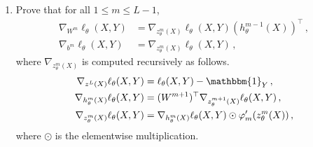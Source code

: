 \documentclass[a4paper,10pt,fleqn]{article}
\newcommand{\eqsp}{\,}
\newcommand{\1}{\ensuremath{\mathbbm{1}}}
\begin{document}
\begin{enumerate}
\item Prove that for all $1\leqslant m\leqslant L-1$,
\begin{align*}
\nabla_{W^m} \ell_{\theta}(X,Y) &= \nabla_{z_{\theta}^m(X)}\ell_{\theta}(X,Y)(h_{\theta}^{m-1}(X))^\top\eqsp,\\
\nabla_{b^m} \ell_{\theta}(X,Y) &=  \nabla_{z_{\theta}^m(X)}\ell_{\theta}(X,Y)\eqsp,
\end{align*}
where $\nabla_{z_{\theta}^m(X)}$ is computed recursively as follows.
\begin{align*}
\nabla_{z^L(X)} \ell_{\theta}(X,Y) &= \ell_{\theta}(X,Y) - \1_Y\eqsp,\\
\nabla_{h_{\theta}^m(X)} \ell_{\theta}(X,Y) &= (W^{m+1})^\top\nabla_{z_{\theta}^{m+1}(X)} \ell_{\theta}(X,Y) \eqsp,\\
\nabla_{z_{\theta}^m(X)} \ell_{\theta}(X,Y) &= \nabla_{h_{\theta}^m(X)}\ell_{\theta}(X,Y) \odot \varphi_m'(z_{\theta}^{m}(X))\eqsp,
\end{align*}
where $\odot$ is the elementwise multiplication.

\vspace{.2cm}


\end{enumerate}
\end{document}
